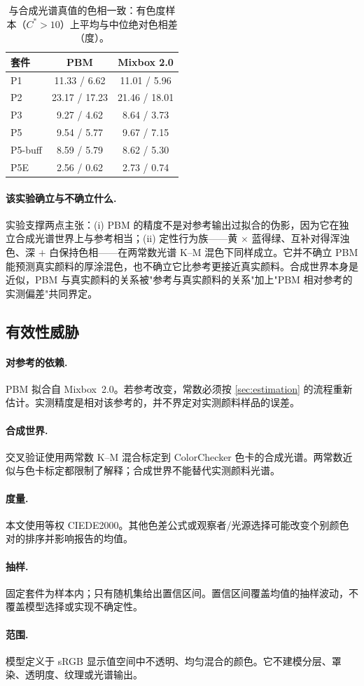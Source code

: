 \begin{table}[t]
\centering
\small
\caption{与合成光谱真值的色相一致：有色度样本（$C^{\ast}>10$）上平均与中位绝对色相差（度）。}
\label{tab:hue}
\begin{tabular}{lcc}
\toprule
套件 & PBM & Mixbox 2.0 \\
\midrule
P1 & 11.33 / 6.62 & 11.01 / 5.96 \\
P2 & 23.17 / 17.23 & 21.46 / 18.01 \\
P3 & 9.27 / 4.62 & 8.64 / 3.73 \\
P5 & 9.54 / 5.77 & 9.67 / 7.15 \\
P5-buff & 8.59 / 5.79 & 8.62 / 5.30 \\
P5E & 2.56 / 0.62 & 2.73 / 0.74 \\
\bottomrule
\end{tabular}
\end{table}

\paragraph{该实验确立与不确立什么.}
实验支撑两点主张：(i) PBM 的精度不是对参考输出过拟合的伪影，因为它在独立合成光谱世界上与参考相当；(ii) 定性行为族——黄 $\times$ 蓝得绿、互补对得浑浊色、深 $+$ 白保持色相——在两常数光谱 K--M 混色下同样成立。它并不确立 PBM 能预测真实颜料的厚涂混色，也不确立它比参考更接近真实颜料。合成世界本身是近似，PBM 与真实颜料的关系被"参考与真实颜料的关系"加上"PBM 相对参考的实测偏差"共同界定。

\subsection{有效性威胁}
\label{sec:threats}

\paragraph{对参考的依赖.}
PBM 拟合自 Mixbox~2.0。若参考改变，常数必须按 \cref{sec:estimation} 的流程重新估计。实测精度是相对该参考的，并不界定对实测颜料样品的误差。

\paragraph{合成世界.}
交叉验证使用两常数 K--M 混合标定到 ColorChecker 色卡的合成光谱。两常数近似与色卡标定都限制了解释；合成世界不能替代实测颜料光谱。

\paragraph{度量.}
本文使用等权 CIEDE2000。其他色差公式或观察者/光源选择可能改变个别颜色对的排序并影响报告的均值。

\paragraph{抽样.}
固定套件为样本内；只有随机集给出置信区间。置信区间覆盖均值的抽样波动，不覆盖模型选择或实现不确定性。

\paragraph{范围.}
模型定义于 sRGB 显示值空间中不透明、均匀混合的颜色。它不建模分层、罩染、透明度、纹理或光谱输出。
